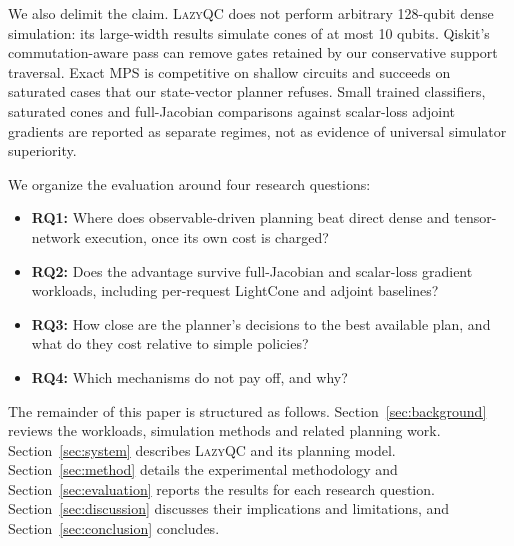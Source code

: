We also delimit the claim. \textsc{LazyQC} does not perform arbitrary 128-qubit dense simulation: its large-width results simulate cones of at most 10 qubits. Qiskit's commutation-aware pass can remove gates retained by our conservative support traversal. Exact MPS is competitive on shallow circuits and succeeds on saturated cases that our state-vector planner refuses. Small trained classifiers, saturated cones and full-Jacobian comparisons against scalar-loss adjoint gradients are reported as separate regimes, not as evidence of universal simulator superiority.

We organize the evaluation around four research questions:
\begin{itemize}
\item \textbf{RQ1:} Where does observable-driven planning beat direct dense and tensor-network execution, once its own cost is charged?
\item \textbf{RQ2:} Does the advantage survive full-Jacobian and scalar-loss gradient workloads, including per-request LightCone and adjoint baselines?
\item \textbf{RQ3:} How close are the planner's decisions to the best available plan, and what do they cost relative to simple policies?
\item \textbf{RQ4:} Which mechanisms do not pay off, and why?
\end{itemize}

The remainder of this paper is structured as follows. Section~\ref{sec:background} reviews the workloads, simulation methods and related planning work. Section~\ref{sec:system} describes \textsc{LazyQC} and its planning model. Section~\ref{sec:method} details the experimental methodology and Section~\ref{sec:evaluation} reports the results for each research question. Section~\ref{sec:discussion} discusses their implications and limitations, and Section~\ref{sec:conclusion} concludes.
